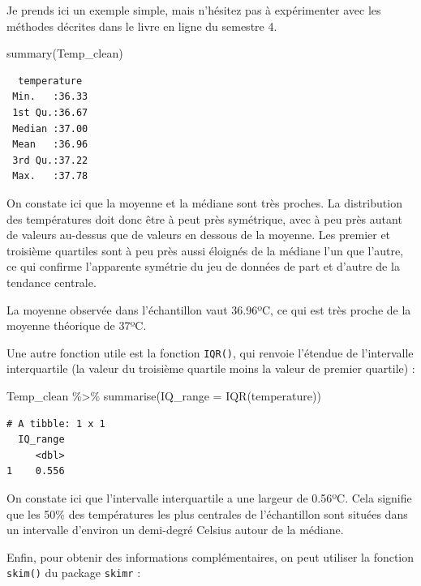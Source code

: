 \documentclass[
  a4paper,
  DIV=11,
  numbers=noendperiod,
  oneside]{scrreprt}
\newenvironment{Shaded}{}{}
\newcommand{\AttributeTok}[1]{\textcolor[rgb]{0.84,0.23,0.29}{#1}}
\newcommand{\FunctionTok}[1]{\textcolor[rgb]{0.44,0.26,0.76}{#1}}
\newcommand{\NormalTok}[1]{\textcolor[rgb]{0.14,0.16,0.18}{#1}}
\newcommand{\SpecialCharTok}[1]{\textcolor[rgb]{0.00,0.36,0.77}{#1}}
\begin{document}
Je prends ici un exemple simple, mais n'hésitez pas à expérimenter avec
les méthodes décrites dans le livre en ligne du semestre 4.

\begin{Shaded}
\begin{Highlighting}[]
\FunctionTok{summary}\NormalTok{(Temp\_clean)}
\end{Highlighting}
\end{Shaded}

\begin{verbatim}
  temperature   
 Min.   :36.33  
 1st Qu.:36.67  
 Median :37.00  
 Mean   :36.96  
 3rd Qu.:37.22  
 Max.   :37.78  
\end{verbatim}

On constate ici que la moyenne et la médiane sont très proches. La
distribution des températures doit donc être à peut près symétrique,
avec à peu près autant de valeurs au-dessus que de valeurs en dessous de
la moyenne. Les premier et troisième quartiles sont à peu près aussi
éloignés de la médiane l'un que l'autre, ce qui confirme l'apparente
symétrie du jeu de données de part et d'autre de la tendance centrale.

La moyenne observée dans l'échantillon vaut 36.96ºC, ce qui est très
proche de la moyenne théorique de 37ºC.

Une autre fonction utile est la fonction \texttt{IQR()}, qui renvoie
l'étendue de l'intervalle interquartile (la valeur du troisième quartile
moins la valeur de premier quartile) :

\begin{Shaded}
\begin{Highlighting}[]
\NormalTok{Temp\_clean }\SpecialCharTok{\%\textgreater{}\%}
  \FunctionTok{summarise}\NormalTok{(}\AttributeTok{IQ\_range =} \FunctionTok{IQR}\NormalTok{(temperature))}
\end{Highlighting}
\end{Shaded}

\begin{verbatim}
# A tibble: 1 x 1
  IQ_range
     <dbl>
1    0.556
\end{verbatim}

On constate ici que l'intervalle interquartile a une largeur de 0.56ºC.
Cela signifie que les 50\% des températures les plus centrales de
l'échantillon sont situées dans un intervalle d'environ un demi-degré
Celsius autour de la médiane.

Enfin, pour obtenir des informations complémentaires, on peut utiliser
la fonction \texttt{skim()} du package \texttt{skimr} :
\end{document}
